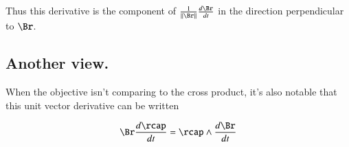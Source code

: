 \documentclass{article}      %
\newcommand{\dt}[1]{\frac{d {#1}}{dt}}
\begin{document}
Thus this derivative is the component of
$\frac{1}{{\Vert \Br \Vert}}\dt{\Br}$
in the direction perpendicular to 
$\Br$.

\subsection{Another view.}

When the objective isn't comparing to the cross product, it's also notable that this unit vector derivative can be written

\[
{{ \Br }} \dt{\rcap}
= \rcap \wedge \dt{\Br}
\]


%
%
%
%
%
\end{document}

